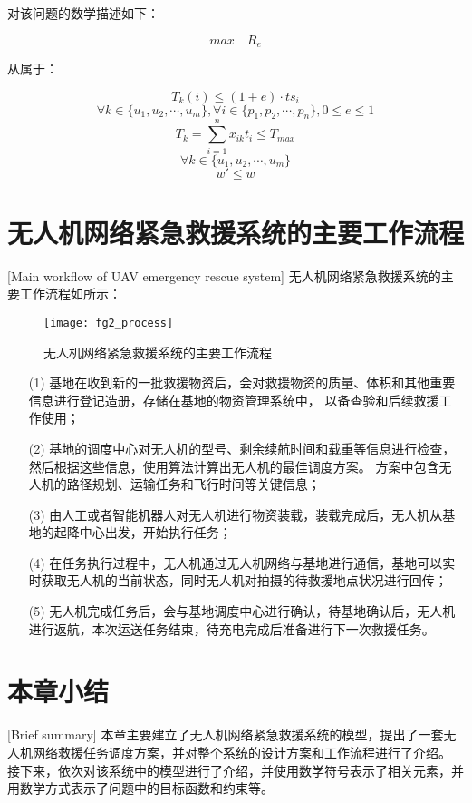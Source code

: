 对该问题的数学描述如下：

\begin{equation}
 {max}\quad{R_e} 
\end{equation}


从属于：


\begin{equation}
	T_k(i) \le (1+e) \cdot ts_i
\end{equation}
\begin{equation}
	{\forall} k\in \lbrace u_1, u_2, \cdots ,u_m \rbrace ,{\forall} i \in \lbrace p_1, p_2, \cdots ,p_n \rbrace,0\le e \le1
\end{equation}
\begin{equation}
	T_k = \sum_{i=1}^n x_{ik}t_i \le T_{max}
\end{equation}
\begin{equation}
	{\forall} k\in \lbrace u_1, u_2, \cdots ,u_m \rbrace
\end{equation}
\begin{equation}
	w \prime \le w
\end{equation}

\section{无人机网络紧急救援系统的主要工作流程}[Main workflow of UAV emergency rescue system]
无人机网络紧急救援系统的主要工作流程如所示：

\begin{figure}[ht]
	\centering
	\texttt{[image: fg2\_process]}
	\caption{无人机网络紧急救援系统的主要工作流程}
	\label{fg202}
\end{figure}

\begin{itemize}
	\item [(1)]基地在收到新的一批救援物资后，会对救援物资的质量、体积和其他重要信息进行登记造册，存储在基地的物资管理系统中，
	以备查验和后续救援工作使用； 
	\item [(2)]基地的调度中心对无人机的型号、剩余续航时间和载重等信息进行检查，然后根据这些信息，使用算法计算出无人机的最佳调度方案。
	方案中包含无人机的路径规划、运输任务和飞行时间等关键信息；
	\item [(3)]由人工或者智能机器人对无人机进行物资装载，装载完成后，无人机从基地的起降中心出发，开始执行任务；
	\item [(4)]在任务执行过程中，无人机通过无人机网络与基地进行通信，基地可以实时获取无人机的当前状态，同时无人机对拍摄的待救援地点状况进行回传；
	\item [(5)]无人机完成任务后，会与基地调度中心进行确认，待基地确认后，无人机进行返航，本次运送任务结束，待充电完成后准备进行下一次救援任务。
\end{itemize}

\section{本章小结}[Brief summary] 
本章主要建立了无人机网络紧急救援系统的模型，提出了一套无人机网络救援任务调度方案，并对整个系统的设计方案和工作流程进行了介绍。
接下来，依次对该系统中的模型进行了介绍，并使用数学符号表示了相关元素，并用数学方式表示了问题中的目标函数和约束等。

